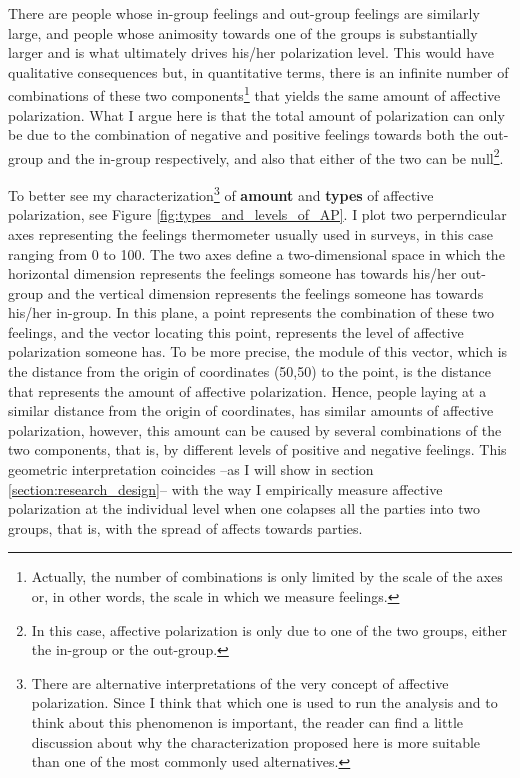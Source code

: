 \documentclass[a4paper, svgnames]{article}
\begin{document}
There are people whose in-group feelings and out-group feelings are similarly large, and people whose animosity towards one of the groups is substantially larger and is what ultimately drives his/her polarization level. This would have qualitative consequences but, in quantitative terms, there is an infinite number of combinations of these two components\footnote{Actually, the number of combinations is only limited by the scale of the axes or, in other words, the scale in which we measure feelings.} that yields the same amount of affective polarization. What I argue here is that the total amount of polarization can only be due to the combination of negative and positive feelings towards both the out-group and the in-group respectively, and also that either of the two can be null\footnote{In this case, affective polarization is only due to one of the two groups, either the in-group or the out-group.}. 

To better see my characterization\footnote{There are alternative interpretations of the very concept of affective polarization. Since I think that which one is used to run the analysis and to think about this phenomenon is important, the reader can find a little discussion about why the characterization proposed here is more suitable than one of the most commonly used alternatives.} of \textbf{amount} and \textbf{types} of affective polarization, see Figure \ref*{fig:types_and_levels_of_AP}. I plot two perperndicular axes representing the feelings thermometer usually used in surveys, in this case ranging from 0 to 100. The two axes define a two-dimensional space in which the horizontal dimension represents the feelings someone has towards his/her out-group and the vertical dimension represents the feelings someone has towards his/her in-group. In this plane, a point represents the combination of these two feelings, and the vector locating this point, represents the level of affective polarization someone has. To be more precise, the module of this vector, which is the distance from the origin of coordinates (50,50) to the point, is the distance that represents the amount of affective polarization. Hence, people laying at a similar distance from the origin of coordinates, has similar amounts of affective polarization, however, this amount can be caused by several combinations of the two components, that is, by different levels of positive and negative feelings. This geometric interpretation coincides --as I will show in section \ref{section:research_design}-- with the way I empirically measure affective polarization at the individual level when one colapses all the parties into two groups, that is, with the spread of affects towards parties.
\end{document}
